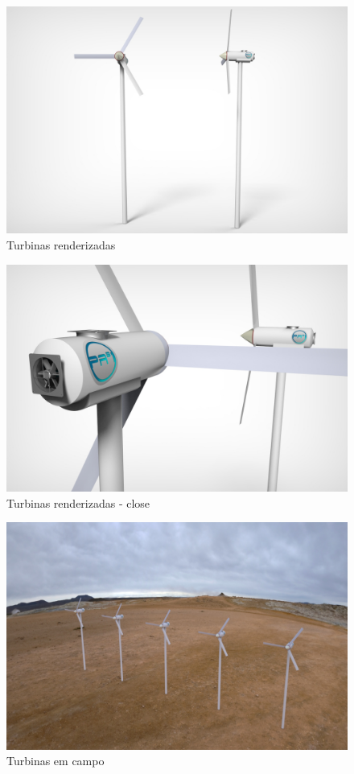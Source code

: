   \begin{figure}[!htbp]
	  \centering
	  \includegraphics[scale=0.35]{editaveis/figuras/pa31_turbinas}
	  \caption[Turbinas renderizadas]{Turbinas renderizadas}
	  \label{pa31_turbinas}
	\end{figure}
	\FloatBarrier
	
  \begin{figure}[!htbp]
	  \centering
	  \includegraphics[scale=0.35]{editaveis/figuras/pa31_turbina_close}
	  \caption[Turbinas renderizadas - close]{Turbinas renderizadas - close}
	  \label{pa31_turbina_close}
	\end{figure}
	\FloatBarrier
	
  \begin{figure}[!htbp]
	  \centering
	  \includegraphics[scale=0.35]{editaveis/figuras/turbina_campo}
	  \caption[Turbinas em campo]{Turbinas em campo}
	  \label{turbina_campo}
	\end{figure}
	\FloatBarrier